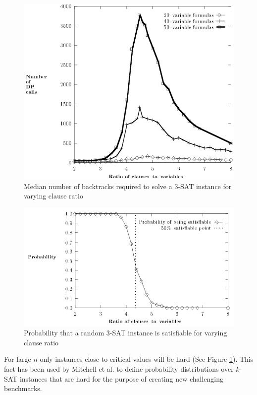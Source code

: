 \begin{figure}
    \centering
    \hspace{-2cm}
    \includegraphics[scale=0.5]{DP_backtracks.png}
    \caption{Median number of backtracks required to solve a 3-SAT instance for varying
    clause ratio \cite{hard_and_easy_distributions}}
    \label{fig:phase_backtracks}
\end{figure}
\begin{figure}
    \centering
    \hspace{-2cm}
    \includegraphics[scale=0.5]{phase_transition_probs.png}
    \caption{Probability that a random 3-SAT instance is satisfiable for varying
    clause ratio \cite{hard_and_easy_distributions}}
    \label{fig:phase_sat_prob}
\end{figure}

For large $n$ only instances close to critical values will be hard
(See Figure \ref{fig:phase_backtracks}).
This fact has been used by Mitchell et al. \cite{hard_and_easy_distributions}
to define probability distributions over $k$-SAT instances that are hard for
the purpose of creating new challenging benchmarks.


